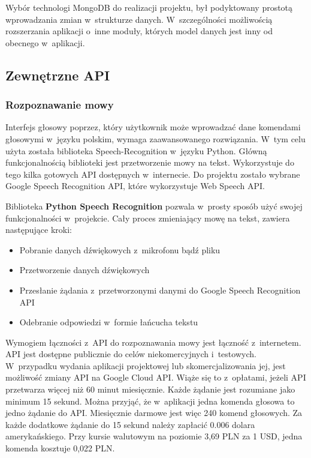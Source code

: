 Wybór technologi MongoDB do realizacji projektu, był podyktowany prostotą wprowadzania zmian w~strukturze danych. W~szczególności możliwością rozszerzania aplikacji o~inne moduły, których model danych jest inny od obecnego w~aplikacji.
\subsection{Zewnętrzne API}
\subsubsection{Rozpoznawanie mowy}
Interfejs głosowy poprzez, który użytkownik może wprowadzać dane komendami głosowymi w~języku polskim, wymaga zaawansowanego rozwiązania. W~tym celu użyta została biblioteka Speech-Recognition w~języku Python\cite{pythonSpeech}. Główną funkcjonalnością biblioteki jest przetworzenie mowy na tekst. Wykorzystuje do tego kilka gotowych API dostępnych w~internecie. Do projektu zostało wybrane Google Speech Recognition API, które wykorzystuje Web Speech API\cite{webSpeechApi}.

Biblioteka \textbf{Python Speech Recognition} pozwala w~prosty sposób użyć swojej funkcjonalności w~projekcie. Cały proces zmieniający mowę na tekst, zawiera następujące kroki:
\begin{itemize}
\item Pobranie danych dźwiękowych z~mikrofonu bądź pliku
\item Przetworzenie danych dźwiękowych
\item Przesłanie żądania z~przetworzonymi danymi do Google Speech Recognition API
\item Odebranie odpowiedzi w~formie łańcucha tekstu
\end{itemize}

Wymogiem łączności z~API do rozpoznawania mowy jest łączność z~internetem. API jest dostępne publicznie do celów niekomercyjnych i~testowych\cite{webSpeechApi}. W~przypadku wydania aplikacji projektowej lub skomercjalizowania jej, jest możliwość zmiany API na Google Cloud API. Wiąże się to z~opłatami, jeżeli API przetwarza więcej niż 60 minut miesięcznie\cite{cloudSpeechAPI}. Każde żądanie jest rozumiane jako minimum 15 sekund. Można przyjąć, że w~aplikacji jedna komenda głosowa to jedno żądanie do API. Miesięcznie darmowe jest więc 240 komend głosowych. Za każde dodatkowe żądanie do 15 sekund należy zapłacić 0.006 dolara amerykańskiego. Przy kursie walutowym na poziomie 3,69 PLN za 1 USD, jedna komenda kosztuje 0,022 PLN.

